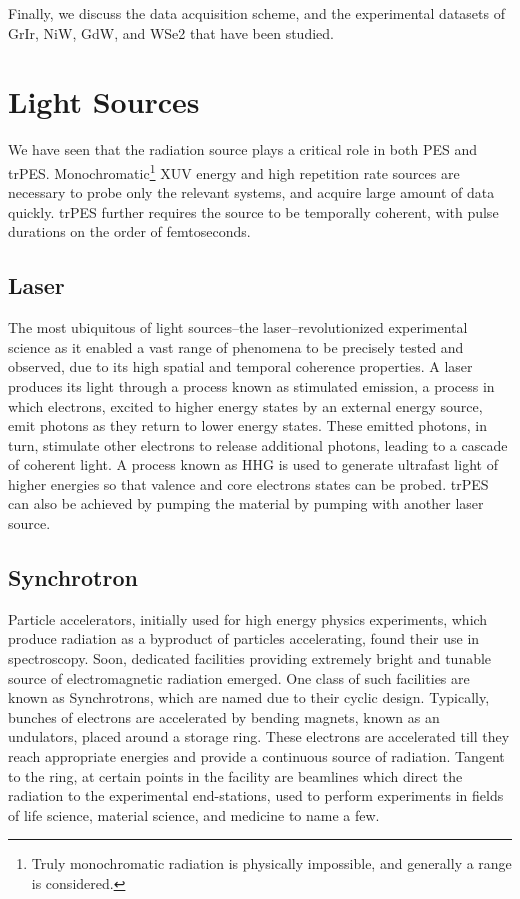 Finally, we discuss the data acquisition scheme, and the experimental datasets of \gls{GrIr}, \gls{NiW}, \gls{GdW}, and \gls{WSe2} that have been studied.

\section{Light Sources}\label{section:light-sources}
We have seen that the radiation source plays a critical role in both \gls{PES} and \gls{trPES}. Monochromatic\footnote{Truly monochromatic radiation is physically impossible, and generally a range is considered.} \gls{XUV} energy and high repetition rate sources are necessary to probe only the relevant systems, and acquire large amount of data quickly. \Gls{trPES} further requires the source to be temporally coherent, with pulse durations on the order of femtoseconds.

\subsection{Laser}
The most ubiquitous of light sources--the laser--revolutionized experimental science as it enabled a vast range of phenomena to be precisely tested and observed, due to its high spatial and temporal coherence properties. A laser produces its light through a process known as stimulated emission, a process in which electrons, excited to higher energy states by an external energy source, emit photons as they return to lower energy states. These emitted photons, in turn, stimulate other electrons to release additional photons, leading to a cascade of coherent light. A process known as \gls{HHG} is used to generate ultrafast light of higher energies so that valence and core electrons states can be probed. \Gls{trPES} can also be achieved by pumping the material by pumping with another laser source.

\subsection{Synchrotron}
Particle accelerators, initially used for high energy physics experiments, which produce radiation as a byproduct of particles accelerating, found their use in spectroscopy. Soon, dedicated facilities providing extremely bright and tunable source of electromagnetic radiation emerged. One class of such facilities are known as Synchrotrons, which are named due to their cyclic design. Typically, bunches of electrons are accelerated by bending magnets, known as an \glspl{undulator}, placed around a storage ring. These electrons are accelerated till they reach appropriate energies and provide a continuous source of radiation. Tangent to the ring, at certain points in the facility are beamlines which direct the radiation to the experimental end-stations, used to perform experiments in fields of life science, material science, and medicine to name a few.

